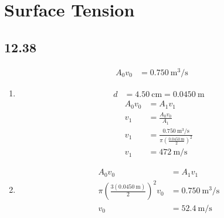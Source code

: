 \documentclass{article}
\begin{document}
\newcommand{\hr}{\par\noindent\rule{\textwidth}{0.4pt}}

\newcommand{\bc}[1]{
	\begin{equation*}
		\begin{boxed}
			{#1}
		\end{boxed}
	\end{equation*}
}

\newcommand{\cond}[2]{
	\ifmmode
		{#1} \quad {#2}
	\else
		$$ {#1} \quad {#2} $$
	\fi
}

\newcommand{\matr}[1]{
	\ifmmode \bm{#1}
	\else \textit{\textbf{#1}}
	\fi
}
\newcommand{\vect}[1]{
	\ifmmode \mathbf{#1}
	\else \textbf{#1}
	\fi
}


\tableofcontents

\section{Surface Tension}

\subsection{12.38}

\begin{align*}
	A_0v_0 & = \SI{0.750}{\meter \cubed \per \second}
\end{align*}
\begin{enumerate}[label = \textbf{(\alph*)}]
	\item
		\begin{align*}
			d & = \SI{4.50}{\centi \meter} = \SI{0.0450}{\meter}
		\end{align*}
		\begin{align*}
			A_0v_0 & = A_1v_1 \\
			v_1 & = \frac{ A_0v_0 }{ A_1 } \\
			v_1 & = \frac{ \SI{0.750}{\meter \cubed \per \second} }{ \pi \left( \frac{ \SI{0.0450}{\meter} }{ 2 } \right)^2 } \\
			v_1 & = \SI{472}{\meter \per \second}
		\end{align*}
	\item
		\begin{align*}
			A_0v_0 & = A_1v_1 \\
			\pi \left( \frac{ 3(\SI{0.0450}{\meter}) }{ 2 } \right)^2v_0 & = \SI{0.750}{\meter \cubed \per \second} \\
			v_0 & = \SI{52.4}{\meter \per \second}
		\end{align*}
\end{enumerate}
\end{document}
